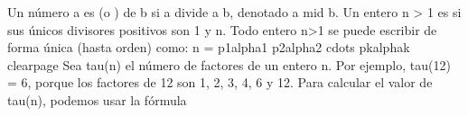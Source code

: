 \markdownRendererDocumentBegin
\markdownRendererSectionBegin
{}\markdownRendererInterblockSeparator
{}\markdownRendererSectionBegin
{}\markdownRendererInterblockSeparator
{}\markdownRendererHardLineBreak
{}Un número \markdownRendererDollarSign{}a\markdownRendererDollarSign{} es  (o ) de \markdownRendererDollarSign{}b\markdownRendererDollarSign{} si \markdownRendererDollarSign{}a\markdownRendererDollarSign{} divide a \markdownRendererDollarSign{}b\markdownRendererDollarSign{}, denotado \markdownRendererDollarSign{}a \markdownRendererBackslash{}mid b\markdownRendererDollarSign{}.\markdownRendererHardLineBreak
{}Un entero \markdownRendererDollarSign{}n > 1\markdownRendererDollarSign{} es  si sus únicos divisores positivos son \markdownRendererDollarSign{}1\markdownRendererDollarSign{} y \markdownRendererDollarSign{}n\markdownRendererDollarSign{}.\markdownRendererParagraphSeparator
{}\markdownRendererHardLineBreak
{}Todo entero \markdownRendererDollarSign{}n>1\markdownRendererDollarSign{} se puede escribir de forma única (hasta orden) como:\markdownRendererSoftLineBreak
{}\markdownRendererDollarSign{}\markdownRendererDollarSign{}\markdownRendererSoftLineBreak
{}n = p\markdownRendererUnderscore{}1\markdownRendererCircumflex{}\markdownRendererLeftBrace{}\markdownRendererBackslash{}alpha\markdownRendererUnderscore{}1\markdownRendererRightBrace{} p\markdownRendererUnderscore{}2\markdownRendererCircumflex{}\markdownRendererLeftBrace{}\markdownRendererBackslash{}alpha\markdownRendererUnderscore{}2\markdownRendererRightBrace{} \markdownRendererBackslash{}cdots p\markdownRendererUnderscore{}k\markdownRendererCircumflex{}\markdownRendererLeftBrace{}\markdownRendererBackslash{}alpha\markdownRendererUnderscore{}k\markdownRendererRightBrace{}\markdownRendererSoftLineBreak
{}\markdownRendererDollarSign{}\markdownRendererDollarSign{}\markdownRendererParagraphSeparator
{}\markdownRendererDollarSign{}\markdownRendererBackslash{}clearpage\markdownRendererDollarSign{}\markdownRendererInterblockSeparator
{}\markdownRendererSectionBegin
{}\markdownRendererInterblockSeparator
{}Sea \markdownRendererDollarSign{}\markdownRendererBackslash{}tau(n)\markdownRendererDollarSign{} el número de factores de un entero n. Por ejemplo, \markdownRendererDollarSign{}\markdownRendererBackslash{}tau(12) = 6\markdownRendererDollarSign{}, porque los factores de 12 son 1, 2, 3, 4, 6 y 12. Para calcular el valor de \markdownRendererDollarSign{}\markdownRendererBackslash{}tau(n)\markdownRendererDollarSign{}, podemos usar la fórmula\markdownRendererParagraphSeparator
